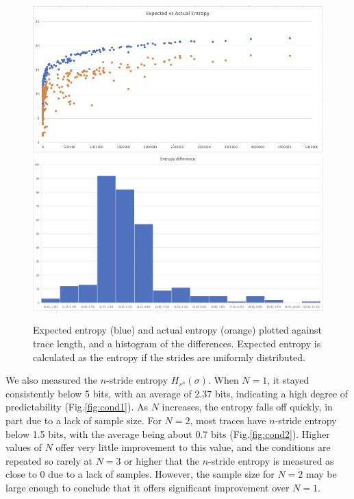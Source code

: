\begin{figure}[ht]
    \centering
    \includegraphics[scale=0.7]{expected entropy.png}
    \includegraphics[scale=0.7]{entropy diff.png}
    \caption{Expected entropy (blue) and actual entropy (orange) plotted against trace length, and a histogram of the differences.  Expected entropy is calculated as the entropy if the strides are uniformly distributed.}
    \label{fig:expected}
\end{figure}
\newpage

We also measured the $n$-stride entropy $H_{s^n}(\sigma)$.  When $N = 1$, it stayed consistently below 5 bits, with an average of 2.37 bits, indicating a high degree of predictability (Fig.\ref{fig:cond1}).  As $N$ increases, the entropy falls off quickly, in part due to a lack of sample size.  For $N = 2$, most traces have $n$-stride entropy below 1.5 bits, with the average being about 0.7 bits (Fig.\ref{fig:cond2}).  Higher values of $N$ offer very little improvement to this value, and the conditions are repeated so rarely at $N = 3$ or higher that the $n$-stride entropy is measured as close to 0 due to a lack of samples.  However, the sample size for $N = 2$ may be large enough to conclude that it offers significant improvement over $N = 1$.

